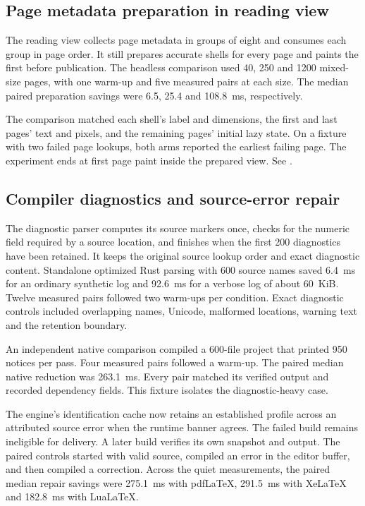 \subsection{Page metadata preparation in reading view}

The reading view collects page metadata in groups of eight and consumes
each group in page order. It still prepares accurate shells for every
page and paints the first before publication. The headless comparison
used 40, 250 and 1200 mixed-size pages, with one warm-up and five
measured pairs at each size. The median paired preparation savings
were 6.5, 25.4 and 108.8~ms, respectively.

The comparison matched each shell's label and dimensions, the first and
last pages' text and pixels, and the remaining pages' initial lazy state.
On a fixture with two failed page lookups, both arms reported the
earliest failing page. The experiment ends at first page paint inside
the prepared view. See
.


\subsection{Compiler diagnostics and source-error repair}

The diagnostic parser computes its source markers once, checks for
the numeric field required by a source location, and finishes when
the first 200 diagnostics have been retained. It keeps the original
source lookup order and exact diagnostic content. Standalone optimized
Rust parsing with 600 source names saved 6.4~ms for an ordinary
synthetic log and 92.6~ms for a verbose log of about 60~KiB.
Twelve measured pairs followed two warm-ups per condition. Exact
diagnostic controls included overlapping names, Unicode, malformed
locations, warning text and the retention boundary.

An independent native comparison compiled a 600-file project that
printed 950 notices per pass. Four measured pairs followed a warm-up.
The paired median native reduction was 263.1~ms. Every pair matched
its verified output and recorded dependency fields. This fixture
isolates the diagnostic-heavy case.

The engine's identification cache now retains an established profile
across an attributed source error when the runtime banner agrees.
The failed build remains ineligible for delivery. A later build
verifies its own snapshot and output. The paired controls started
with valid source, compiled an error in the editor buffer, and then
compiled a correction. Across the quiet measurements, the paired
median repair savings were 275.1~ms with pdf\LaTeX{},
291.5~ms with Xe\LaTeX{} and 182.8~ms with Lua\LaTeX{}.


